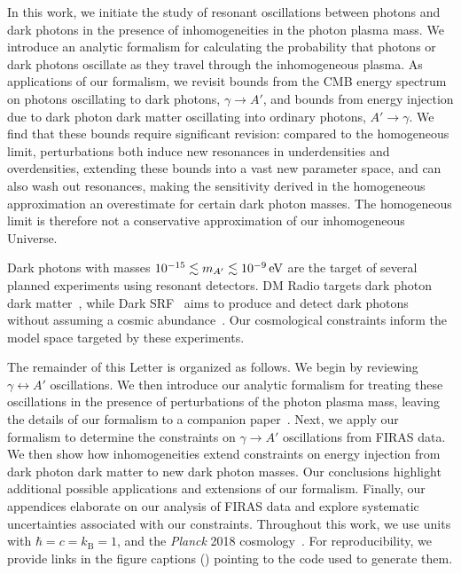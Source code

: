 \documentclass[prd,aps,10pt,nofootinbib,twocolumn,superscriptaddress,preprintnumbers,balancelastpage,longbibliography]{revtex4-1}
\begin{document}
In this work, we initiate the study of resonant oscillations between photons and dark photons in the presence of inhomogeneities in the photon plasma mass.  We introduce an analytic formalism for calculating the probability that photons or dark photons oscillate as they travel through the inhomogeneous plasma.  As applications of our formalism, we revisit bounds from the CMB energy spectrum on photons oscillating to dark photons, $\gamma \rightarrow A'$, and bounds from energy injection due to dark photon dark matter oscillating into ordinary photons, $A' \rightarrow \gamma $.  We find that these bounds require significant revision: compared to the homogeneous limit, perturbations both induce new resonances in underdensities and overdensities, extending these bounds into a vast new parameter space, and can also wash out resonances, making the sensitivity derived in the homogeneous approximation an overestimate for certain dark photon masses. The homogeneous limit is therefore not a conservative approximation of our inhomogeneous Universe.

Dark photons with masses $10^{-15} \lesssim \mAp \lesssim \SI{e-9}{\eV}$ are the target of several planned experiments using resonant detectors. DM Radio targets dark photon dark matter~\cite{Chaudhuri:2014dla,Silva-Feaver:2016qhh}, while Dark SRF~\cite{HarnikSRF,GrassellinoSRF} aims to produce and detect dark photons without assuming a cosmic abundance~\cite{Graham:2014sha}. Our cosmological constraints  inform the model space targeted by these experiments.

The remainder of this Letter is organized as follows.  We begin by reviewing $\gamma \leftrightarrow A'$ oscillations.  We then introduce our analytic formalism for treating these oscillations in the presence of perturbations of the photon plasma mass, leaving the details of our formalism to a companion paper~\cite{OurLongPaper}.  Next, we apply our formalism to determine the constraints on $\gamma \rightarrow A'$ oscillations from FIRAS data.  We then show how inhomogeneities extend constraints on energy injection from dark photon dark matter to new dark photon masses.  Our conclusions highlight additional possible applications and extensions of our formalism. Finally, our appendices elaborate on our analysis of FIRAS data and explore systematic uncertainties associated with our constraints. Throughout this work, we use units with $\hbar = c = k_\mathrm{B} = 1$, and the \textit{Planck} 2018 cosmology~\cite{Aghanim:2019ame}. For reproducibility, we provide links in the figure captions (\nbicon) pointing to the code used to generate them.
\end{document}
